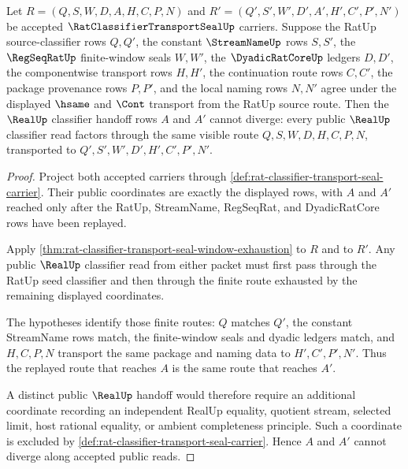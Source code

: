 \begin{theorem}
\label{thm:rat-classifier-transport-seal-classifier-handoff-determinacy}
Let $R=(Q,S,W,D,A,H,C,P,N)$ and $R'=(Q',S',W',D',A',H',C',P',N')$ be accepted $\RatClassifierTransportSealUp$ carriers. Suppose the RatUp source-classifier rows $Q,Q'$, the constant $\StreamNameUp$ rows $S,S'$, the $\RegSeqRatUp$ finite-window seals $W,W'$, the $\DyadicRatCoreUp$ ledgers $D,D'$, the componentwise transport rows $H,H'$, the continuation route rows $C,C'$, the package provenance rows $P,P'$, and the local naming rows $N,N'$ agree under the displayed $\hsame$ and $\Cont$ transport from the RatUp source route. Then the $\RealUp$ classifier handoff rows $A$ and $A'$ cannot diverge: every public $\RealUp$ classifier read factors through the same visible route $Q,S,W,D,H,C,P,N$, transported to $Q',S',W',D',H',C',P',N'$.
\end{theorem}
\begin{proof}
Project both accepted carriers through \autoref{def:rat-classifier-transport-seal-carrier}. Their public coordinates are exactly the displayed rows, with $A$ and $A'$ reached only after the RatUp, StreamName, RegSeqRat, and DyadicRatCore rows have been replayed.

Apply \autoref{thm:rat-classifier-transport-seal-window-exhaustion} to $R$ and to $R'$. Any public $\RealUp$ classifier read from either packet must first pass through the RatUp seed classifier and then through the finite route exhausted by the remaining displayed coordinates.

The hypotheses identify those finite routes: $Q$ matches $Q'$, the constant StreamName rows match, the finite-window seals and dyadic ledgers match, and $H,C,P,N$ transport the same package and naming data to $H',C',P',N'$. Thus the replayed route that reaches $A$ is the same route that reaches $A'$.

A distinct public $\RealUp$ handoff would therefore require an additional coordinate recording an independent RealUp equality, quotient stream, selected limit, host rational equality, or ambient completeness principle. Such a coordinate is excluded by \autoref{def:rat-classifier-transport-seal-carrier}. Hence $A$ and $A'$ cannot diverge along accepted public reads.
\end{proof}


